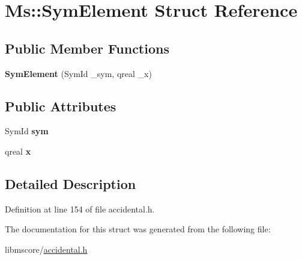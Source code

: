 \hypertarget{struct_ms_1_1_sym_element}{}\section{Ms\+:\+:Sym\+Element Struct Reference}
\label{struct_ms_1_1_sym_element}
\subsection*{Public Member Functions}
\begin{DoxyCompactItemize}
\item 
\mbox{\label{struct_ms_1_1_sym_element_af20fb4b740f45c1aa8ee7391cb3e5ef6}} 
{\bfseries Sym\+Element} (Sym\+Id \+\_\+sym, qreal \+\_\+x)
\end{DoxyCompactItemize}
\subsection*{Public Attributes}
\begin{DoxyCompactItemize}
\item 
\mbox{\label{struct_ms_1_1_sym_element_ab131ec73c5143606852008a9d116c343}} 
Sym\+Id {\bfseries sym}
\item 
\mbox{\label{struct_ms_1_1_sym_element_a98ae6ce6a72fcdf38fb689f670185918}} 
qreal {\bfseries x}
\end{DoxyCompactItemize}


\subsection{Detailed Description}


Definition at line 154 of file accidental.\+h.



The documentation for this struct was generated from the following file\+:\begin{DoxyCompactItemize}
\item 
libmscore/\hyperlink{accidental_8h}{accidental.\+h}\end{DoxyCompactItemize}
